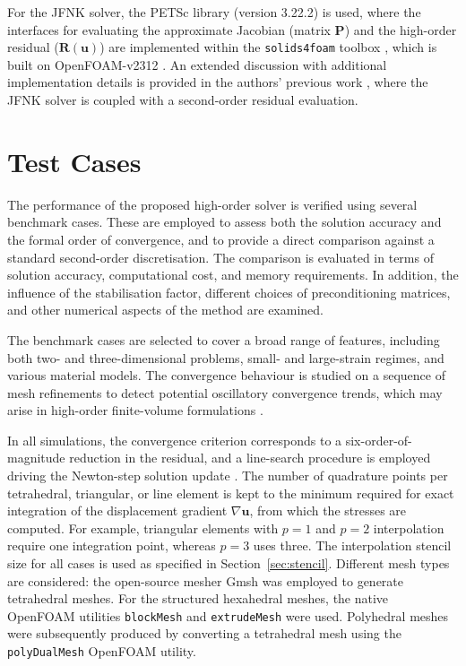 \documentclass[sn-mathphys,Numbered]{sn-jnl}%
\newcommand{\bb}{\boldsymbol}
\begin{document}
For the JFNK solver, the PETSc library (version 3.22.2) \cite{PETSc} is used, where the interfaces for evaluating the approximate Jacobian (matrix $\bb{P}$) and the high-order residual ($\boldsymbol{R}(\bb{u})$) are implemented within the \texttt{solids4foam} toolbox \cite{Cardiff2018, Tukovic2018, Cardiff2025a}, which is built on OpenFOAM-v2312 \cite{Weller1998}.
An extended discussion with additional implementation details is provided in the authors’ previous work \cite{Cardiff2025}, where the JFNK solver is coupled with a second-order residual evaluation.
%
%
\section{Test Cases}
\label{sec:test_cases}
%
%
The performance of the proposed high-order solver is verified using several benchmark cases.
These are employed to assess both the solution accuracy and the formal order of convergence, and to provide a direct comparison against a standard second-order discretisation.
The comparison is evaluated in terms of solution accuracy, computational cost, and memory requirements.
In addition, the influence of the stabilisation factor, different choices of preconditioning matrices, and other numerical aspects of the method are examined.

The benchmark cases are selected to cover a broad range of features, including both two- and three-dimensional problems, small- and large-strain regimes,
and various material models.
The convergence behaviour is studied on a sequence of mesh refinements to detect potential oscillatory convergence trends, which may arise in high-order finite-volume formulations \cite{Nishikawa2025a}.

In all simulations, the convergence criterion corresponds to a six-order-of-magnitude reduction in the residual, and a line-search procedure is employed driving the Newton-step solution update \cite{Cardiff2025}.
The number of quadrature points per tetrahedral, triangular, or line element is kept to the minimum required for exact integration of the displacement gradient $\nabla \bb{u}$, from which the stresses are computed.
For example, triangular elements with $p=1$ and $p=2$ interpolation require one integration point, whereas $p=3$ uses three.
The interpolation stencil size for all cases is used as specified in Section~\ref{sec:stencil}.
Different mesh types are considered: the open-source mesher Gmsh \cite{geuzaine2009gmsh} was employed to generate tetrahedral meshes. 
For the structured hexahedral meshes, the native OpenFOAM utilities \texttt{blockMesh} and \texttt{extrudeMesh} were used. 
Polyhedral meshes were subsequently produced by converting a tetrahedral mesh using the \texttt{polyDualMesh} OpenFOAM utility.
%
%
%
%
\end{document}
